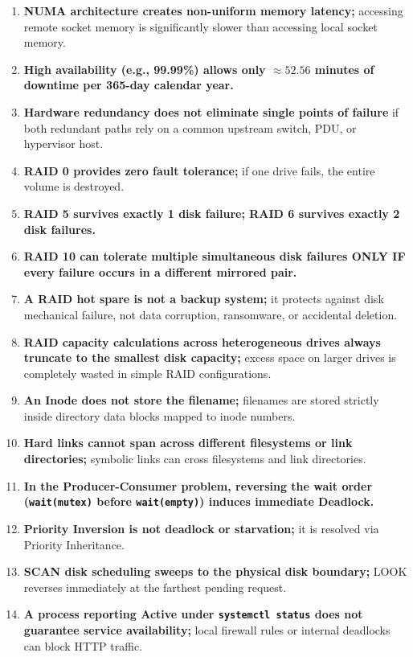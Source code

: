 \begin{enumerate}
    \item \textbf{NUMA architecture creates non-uniform memory latency;} accessing remote socket memory is significantly slower than accessing local socket memory.
    \item \textbf{High availability (e.g., 99.99\%) allows only $\approx 52.56$ minutes of downtime per 365-day calendar year.}
    \item \textbf{Hardware redundancy does not eliminate single points of failure} if both redundant paths rely on a common upstream switch, PDU, or hypervisor host.
    \item \textbf{RAID 0 provides zero fault tolerance;} if one drive fails, the entire volume is destroyed.
    \item \textbf{RAID 5 survives exactly 1 disk failure; RAID 6 survives exactly 2 disk failures.}
    \item \textbf{RAID 10 can tolerate multiple simultaneous disk failures ONLY IF every failure occurs in a different mirrored pair.}
    \item \textbf{A RAID hot spare is not a backup system;} it protects against disk mechanical failure, not data corruption, ransomware, or accidental deletion.
    \item \textbf{RAID capacity calculations across heterogeneous drives always truncate to the smallest disk capacity;} excess space on larger drives is completely wasted in simple RAID configurations.
    \item \textbf{An Inode does not store the filename;} filenames are stored strictly inside directory data blocks mapped to inode numbers.
    \item \textbf{Hard links cannot span across different filesystems or link directories;} symbolic links can cross filesystems and link directories.
    \item \textbf{In the Producer-Consumer problem, reversing the wait order (\texttt{wait(mutex)} before \texttt{wait(empty)}) induces immediate Deadlock.}
    \item \textbf{Priority Inversion is not deadlock or starvation;} it is resolved via Priority Inheritance.
    \item \textbf{SCAN disk scheduling sweeps to the physical disk boundary;} LOOK reverses immediately at the farthest pending request.
    \item \textbf{A process reporting Active under \texttt{systemctl status} does not guarantee service availability;} local firewall rules or internal deadlocks can block HTTP traffic.
\end{enumerate}
